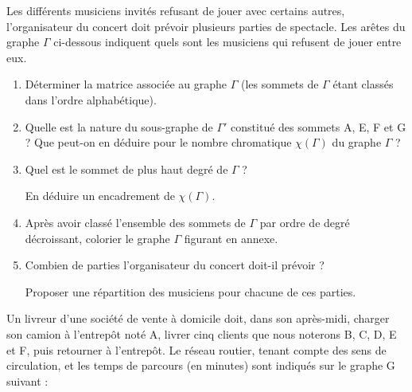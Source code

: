\documentclass[]{prof}
\begin{document}
Les différents musiciens invités refusant de jouer avec certains autres, l'organisateur du concert doit prévoir plusieurs parties de spectacle. Les arêtes du  graphe $\Gamma$ ci-dessous indiquent quels sont les musiciens qui refusent de jouer entre eux.

\medskip
\begin{center}
\end{center}

\bigskip
\begin{enumerate} 
\item Déterminer la matrice associée au graphe $\Gamma$ (les sommets de $\Gamma$ étant classés dans l'ordre alphabétique).

\item Quelle est la nature du sous-graphe de $\Gamma '$ constitué des sommets A, E, F et G ?
Que peut-on en déduire pour le nombre chromatique $\chi(\Gamma)$ du graphe $\Gamma$ ?
\item Quel est le sommet de plus haut degré de $\Gamma$ ?

En déduire un encadrement de $\chi(\Gamma)$.

\item Après avoir classé l'ensemble des sommets de $\Gamma$ par ordre de degré décroissant, colorier le graphe $\Gamma$ figurant en annexe.

\item Combien de parties l'organisateur du concert doit-il  prévoir ?

Proposer une répartition des musiciens pour chacune de ces parties.
\end{enumerate}


\vfill\newpage\null 


\bigskip
Un livreur d'une société de vente à domicile doit, dans son après-midi, charger son camion à l'entrepôt noté A, livrer cinq clients que nous noterons B, C, D, E et F, puis retourner à l'entrepôt. Le réseau routier, tenant compte des sens de circulation, et les temps de parcours (en minutes) sont indiqués sur le graphe G suivant :
\end{document}
